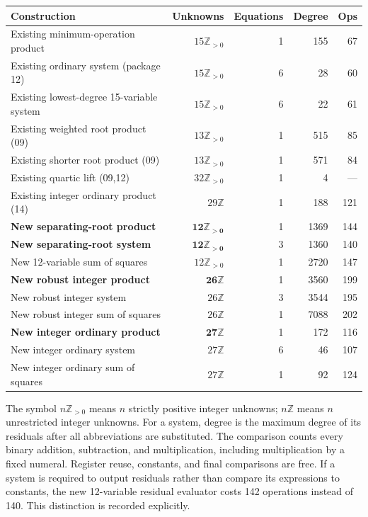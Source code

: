 \documentclass[11pt]{article}
\newcommand{\Z}{\mathbb Z}
\newcommand{\Pos}{\mathbb Z_{>0}}
\theoremstyle{remark}\newtheorem{remark}[theorem]{Remark}
\begin{document}
\begin{center}\small
\begin{tabular}{>{\raggedright\arraybackslash}p{5.2cm}rrrr}
\toprule
Construction & Unknowns & Equations & Degree & Ops\\
\midrule
Existing minimum-operation product & $15\Pos$ &1&155&67\\
Existing ordinary system (package 12)&$15\Pos$&6&28&60\\
Existing lowest-degree 15-variable system&$15\Pos$&6&22&61\\
Existing weighted root product (09)&$13\Pos$&1&515&85\\
Existing shorter root product (09)&$13\Pos$&1&571&84\\
Existing quartic lift (09,12)&$32\Pos$&1&4&---\\
Existing integer ordinary product (14)&$29\Z$&1&188&121\\
\midrule
\textbf{New separating-root product}&$\mathbf{12\Pos}$&1&1369&144\\
\textbf{New separating-root system}&$\mathbf{12\Pos}$&3&1360&140\\
New 12-variable sum of squares&$12\Pos$&1&2720&147\\
\textbf{New robust integer product}&$\mathbf{26\Z}$&1&3560&199\\
New robust integer system&$26\Z$&3&3544&195\\
New robust integer sum of squares&$26\Z$&1&7088&202\\
\textbf{New integer ordinary product}&$\mathbf{27\Z}$&1&172&116\\
New integer ordinary system&$27\Z$&6&46&107\\
New integer ordinary sum of squares&$27\Z$&1&92&124\\
\bottomrule
\end{tabular}
\end{center}

The symbol $n\Pos$ means $n$ strictly positive integer unknowns; $n\Z$ means
$n$ unrestricted integer unknowns. For a system, degree is the maximum degree
of its residuals after all abbreviations are substituted. The comparison
counts every binary addition, subtraction, and multiplication, including
multiplication by a fixed numeral. Register reuse, constants, and final
comparisons are free. If a system is required to output residuals rather than
compare its expressions to constants, the new 12-variable residual evaluator
costs 142 operations instead of 140. This distinction is recorded explicitly.
\end{document}
